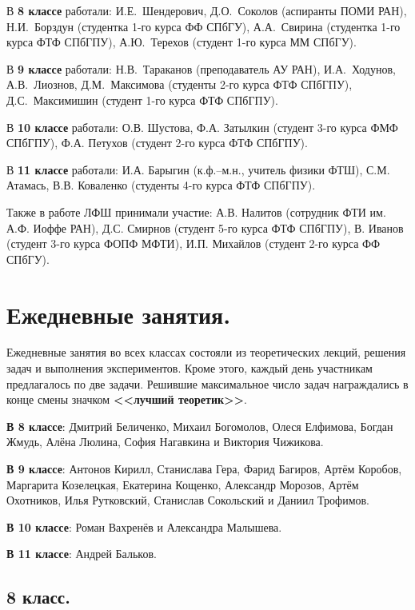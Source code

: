 \documentclass[12pt]{article}
\newlength{\h}
\newlength{\x}
\begin{document}
В \textbf{8 классе} работали: И.Е.~Шендерович, Д.О.~Соколов (аспиранты
ПОМИ РАН), Н.И.~Борздун (студентка 1-го курса ФФ СПбГУ), А.А.~Свирина
(студентка 1-го курса ФТФ СПбГПУ), А.Ю.~Терехов (студент 1-го курса ММ СПбГУ).

В \textbf{9 классе} работали: Н.В.~Тараканов (преподаватель АУ РАН),
И.А.~Ходунов, А.В.~Лиознов, Д.М.~Максимова (студенты 2-го курса ФТФ
СПбГПУ), Д.С.~Максимишин (студент 1-го курса ФТФ СПбГПУ). 

В \textbf{10 классе} работали: О.В. Шустова, Ф.А. Затылкин (студент 3-го
курса ФМФ СПбГПУ), Ф.А. Петухов (студент 2-го курса ФТФ СПбГПУ). 

В \textbf{11 классе} работали: И.А. Барыгин (к.ф.--м.н., учитель
физики ФТШ), С.М. Атамась, В.В. Коваленко (студенты 4-го курса ФТФ
СПбГПУ).

Также в работе ЛФШ принимали участие: А.В. Налитов (сотрудник ФТИ
им. А.Ф. Иоффе РАН), Д.С. Смирнов (студент 5-го курса ФТФ СПбГПУ),
В. Иванов (студент 3-го курса ФОПФ МФТИ), И.П. Михайлов (студент 2-го
курса ФФ СПбГУ).

\clearpage

\section{Ежедневные занятия.}
\label{sec:daily}

Ежедневные занятия во всех классах состояли из теоретических лекций,
решения задач и выполнения экспериментов. Кроме этого, каждый день
участникам предлагалось по две задачи. Решившие максимальное число
задач награждались в конце смены значком \textbf{<<лучший
  теоретик>>}.

\textbf{В 8 классе}: Дмитрий Беличенко, Михаил Богомолов, Олеся Елфимова,
Богдан Жмудь, Алёна Люлина, София Нагавкина и Виктория Чижикова. 

\textbf{В 9 классе}: Антонов Кирилл, Станислава Гера, Фарид Багиров,
Артём Коробов, Маргарита Козелецкая, Екатерина Кощенко, Александр
Морозов, Артём Охотников, Илья Рутковский, Станислав Сокольский и
Даниил Трофимов.

\textbf{В 10 классе}: Роман Вахренёв и Александра Малышева. 

\textbf{В 11 классе}: Андрей Бальков.


\subsection{8 класс. }
\label{sec:daily8}
\end{document}
